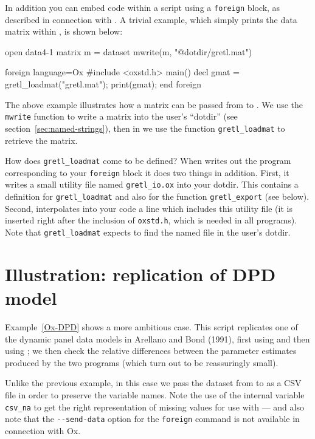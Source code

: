In addition you can embed  code within a  script
using a \texttt{foreign} block, as described in connection with
.  A trivial example, which simply prints the  data
matrix within , is shown below:
%
\begin{code}
open data4-1
matrix m = { dataset }
mwrite(m, "@dotdir/gretl.mat")

foreign language=Ox 
#include <oxstd.h>
main()
{
   decl gmat = gretl_loadmat("gretl.mat");
   print(gmat);
}
end foreign
\end{code}

The above example illustrates how a matrix can be passed from
 to .  We use the \texttt{mwrite} function to write
a matrix into the user's ``dotdir'' (see
section~\ref{sec:named-strings}), then in  we use the function
\verb|gretl_loadmat| to retrieve the matrix.

How does \verb|gretl_loadmat| come to be defined?  When 
writes out the  program corresponding to your \texttt{foreign}
block it does two things in addition.  First, it writes a small
utility file named \verb|gretl_io.ox| into your dotdir.  This contains
a definition for \verb|gretl_loadmat| and also for the function
\verb|gretl_export| (see below).  Second,  interpolates
into your  code a line which includes this utility file (it is
inserted right after the inclusion of \texttt{oxstd.h}, which is
needed in all  programs).  Note that \verb|gretl_loadmat|
expects to find the named file in the user's dotdir.

\section{Illustration: replication of DPD model}
\label{sec:dpd-replication}

Example~\ref{Ox-DPD} shows a more ambitious case.  This script
replicates one of the dynamic panel data models in Arellano and Bond
(1991), first using  and then using ; we then check
the relative differences between the parameter estimates produced by
the two programs (which turn out to be reassuringly small).

Unlike the previous example, in this case we pass the dataset from
 to  as a CSV file in order to preserve the
variable names.  Note the use of the internal variable \verb|csv_na|
to get the right representation of missing values for use with
 --- and also note that the \verb|--send-data| option for the
\texttt{foreign} command is not available in connection with Ox.


